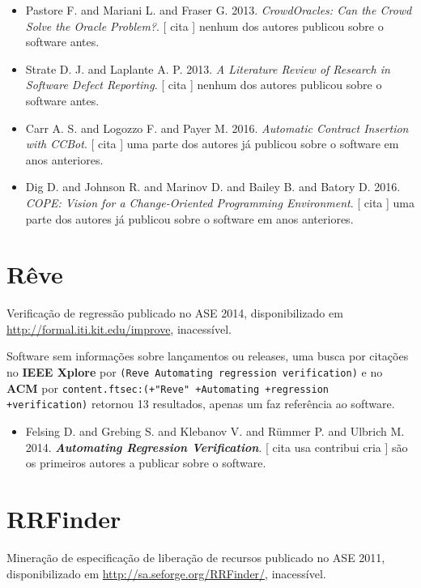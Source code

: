 \begin{itemize}
\item Pastore F. and Mariani L. and Fraser G.
      2013.
        \textit{ CrowdOracles: Can the Crowd Solve the Oracle Problem?}.
      [
          cita
      ]
nenhum dos autores publicou sobre o software antes.
\item Strate D. J. and Laplante A. P.
      2013.
        \textit{ A Literature Review of Research in Software Defect Reporting}.
      [
          cita
      ]
nenhum dos autores publicou sobre o software antes.
\item Carr A. S. and Logozzo F. and Payer M.
      2016.
        \textit{ Automatic Contract Insertion with CCBot}.
      [
          cita
      ]
uma parte dos autores já publicou sobre o software em anos anteriores.
\item Dig D. and Johnson R. and Marinov D. and Bailey B. and Batory D.
      2016.
        \textit{ COPE: Vision for a Change-Oriented Programming Environment}.
      [
          cita
      ]
uma parte dos autores já publicou sobre o software em anos anteriores.
\end{itemize}
\section{Rêve}

Verificação de regressão
publicado no ASE 2014,
disponibilizado em \url{http://formal.iti.kit.edu/improve},
inacessível.

Software sem informações sobre lançamentos ou releases,
uma busca por citações no {\bf IEEE Xplore} por
\texttt{(Reve Automating regression verification)}
e no {\bf ACM} por
\texttt{content.ftsec:(+"Reve" +Automating +regression +verification)}
retornou
13 resultados,
apenas um faz referência ao software.

\begin{itemize}
\item Felsing D. and Grebing S. and Klebanov V. and R\"{u}mmer P. and Ulbrich M.
      2014.
        \textbf{\textit{ Automating Regression Verification}}.
      [
          cita
          usa
          contribui
          cria
      ]
são os primeiros autores a publicar sobre o software.
\end{itemize}
\section{RRFinder}

Mineração de especificação de liberação de recursos
publicado no ASE 2011,
disponibilizado em \url{http://sa.seforge.org/RRFinder/},
inacessível.

